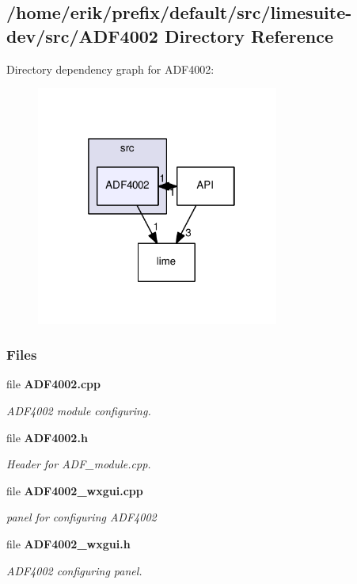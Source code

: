 \subsection{/home/erik/prefix/default/src/limesuite-\/dev/src/\+A\+D\+F4002 Directory Reference}
\label{dir_21fb99076e4d12f47e7703e65e84a599}
Directory dependency graph for A\+D\+F4002\+:
\nopagebreak
\begin{figure}[H]
\begin{center}
\leavevmode
\includegraphics[width=226pt]{dir_21fb99076e4d12f47e7703e65e84a599_dep}
\end{center}
\end{figure}
\subsubsection*{Files}
\begin{DoxyCompactItemize}
\item 
file {\bf A\+D\+F4002.\+cpp}
\begin{DoxyCompactList}\small\item\em A\+D\+F4002 module configuring. \end{DoxyCompactList}\item 
file {\bf A\+D\+F4002.\+h}
\begin{DoxyCompactList}\small\item\em Header for A\+D\+F\+\_\+module.\+cpp. \end{DoxyCompactList}\item 
file {\bf A\+D\+F4002\+\_\+wxgui.\+cpp}
\begin{DoxyCompactList}\small\item\em panel for configuring A\+D\+F4002 \end{DoxyCompactList}\item 
file {\bf A\+D\+F4002\+\_\+wxgui.\+h}
\begin{DoxyCompactList}\small\item\em A\+D\+F4002 configuring panel. \end{DoxyCompactList}\end{DoxyCompactItemize}
